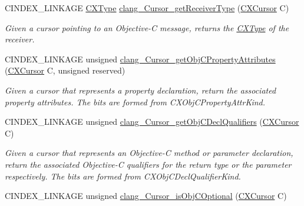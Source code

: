 \begin{DoxyCompactItemize}
\mbox{\label{group__CINDEX__CURSOR__XREF_ga252a679781181d3a6dbd680a215c9594}} 
C\+I\+N\+D\+E\+X\+\_\+\+L\+I\+N\+K\+A\+GE \hyperlink{structCXType}{C\+X\+Type} \hyperlink{group__CINDEX__CURSOR__XREF_ga252a679781181d3a6dbd680a215c9594}{clang\+\_\+\+Cursor\+\_\+get\+Receiver\+Type} (\hyperlink{structCXCursor}{C\+X\+Cursor} C)
\begin{DoxyCompactList}\small\item\em Given a cursor pointing to an Objective-\/C message, returns the \hyperlink{structCXType}{C\+X\+Type} of the receiver. \end{DoxyCompactList}\item 
C\+I\+N\+D\+E\+X\+\_\+\+L\+I\+N\+K\+A\+GE unsigned \hyperlink{group__CINDEX__CURSOR__XREF_ga3a964b4c56f8bfb8229a9a08114e2567}{clang\+\_\+\+Cursor\+\_\+get\+Obj\+C\+Property\+Attributes} (\hyperlink{structCXCursor}{C\+X\+Cursor} C, unsigned reserved)
\begin{DoxyCompactList}\small\item\em Given a cursor that represents a property declaration, return the associated property attributes. The bits are formed from {\ttfamily C\+X\+Obj\+C\+Property\+Attr\+Kind}. \end{DoxyCompactList}\item 
\mbox{\label{group__CINDEX__CURSOR__XREF_ga551d4dd1d81d7a818b68cf3811546671}} 
C\+I\+N\+D\+E\+X\+\_\+\+L\+I\+N\+K\+A\+GE unsigned \hyperlink{group__CINDEX__CURSOR__XREF_ga551d4dd1d81d7a818b68cf3811546671}{clang\+\_\+\+Cursor\+\_\+get\+Obj\+C\+Decl\+Qualifiers} (\hyperlink{structCXCursor}{C\+X\+Cursor} C)
\begin{DoxyCompactList}\small\item\em Given a cursor that represents an Objective-\/C method or parameter declaration, return the associated Objective-\/C qualifiers for the return type or the parameter respectively. The bits are formed from C\+X\+Obj\+C\+Decl\+Qualifier\+Kind. \end{DoxyCompactList}\item 
\mbox{\label{group__CINDEX__CURSOR__XREF_ga1dcb3b9d9471aebb2167c93b47c018b8}} 
C\+I\+N\+D\+E\+X\+\_\+\+L\+I\+N\+K\+A\+GE unsigned \hyperlink{group__CINDEX__CURSOR__XREF_ga1dcb3b9d9471aebb2167c93b47c018b8}{clang\+\_\+\+Cursor\+\_\+is\+Obj\+C\+Optional} (\hyperlink{structCXCursor}{C\+X\+Cursor} C)

\end{DoxyCompactItemize}
